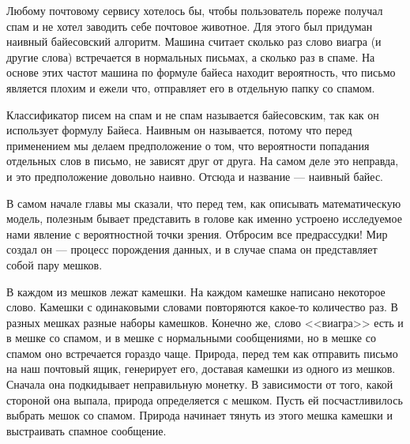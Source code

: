 Любому почтовому сервису хотелось бы, чтобы пользователь пореже получал спам и не хотел заводить себе почтовое животное.  Для этого был придуман наивный байесовский алгоритм. Машина считает сколько раз слово виагра (и другие слова) встречается в нормальных письмах, а сколько раз в спаме.  На основе этих частот машина по формуле байеса находит вероятность, что письмо является плохим и ежели что, отправляет его в отдельную папку со спамом. 

Классификатор писем на спам и не спам называется байесовским, так как он использует формулу Байеса. Наивным он называется, потому что перед применением мы делаем предположение о том, что вероятности попадания отдельных слов в письмо, не зависят друг от друга. На самом деле это неправда, и это предположение довольно наивно. Отсюда и название --- наивный байес. 

В самом начале главы мы сказали, что перед тем, как описывать математическую модель, полезным бывает представить в голове как именно устроено исследуемое нами явление с вероятностной точки зрения. Отбросим все предрассудки! Мир создал он --- процесс порождения данных, и в случае спама он представляет собой пару мешков. 

\begin{center}
\end{center}


В каждом из мешков лежат камешки. На каждом камешке написано некоторое слово. Камешки с одинаковыми словами повторяются какое-то количество раз. В разных мешках разные наборы камешков. Конечно же, слово <<виагра>> есть и в мешке со спамом, и в мешке с нормальными сообщениями, но  в мешке со спамом оно встречается гораздо чаще.  Природа, перед тем как отправить письмо на наш почтовый ящик, генерирует его, доставая камешки из одного из мешков. Сначала она подкидывает неправильную монетку. В зависимости от того, какой стороной она выпала, природа определяется с мешком. Пусть ей посчастливилось выбрать мешок со спамом.  Природа начинает тянуть из этого мешка камешки и выстраивать спамное сообщение. 

